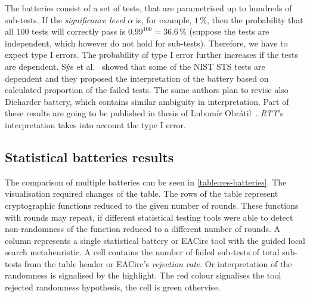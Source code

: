 \documentclass[
    digital,    %
    oneside,    %
    color,
    11pt,
    nocover,
    notable,
    nolof,
    nolot,
]{fithesis3}
\begin{document}
The batteries consist of a set of tests, that are parametrised up to hundreds of sub-tests. If the \textit{significance level} $\alpha$ is, for example, $1\,\%$, then the probability that all 100 tests will correctly pass is $0.99^{100}=36.6\,\%$ (suppose the tests are independent, which however do not hold for sub-tests). Therefore, we have to expect type I errors. The probability of type I error further increases if the tests are dependent. Sýs et al.~\cite{sys2015interpretation} showed that some of the NIST STS tests are dependent and they proposed the interpretation of the battery based on calculated proportion of the failed tests. The same authors plan to revise also Dieharder battery, which contains similar ambiguity in interpretation. Part of these results are going to be published in thesis of Lubomír Obrátil~\cite{obratilMgrThesis}. \textit{RTT}'s interpretation takes into account the type I error.

\subsection{Statistical batteries results}
\label{subsec:relatwork-stat-res}

The comparison of multiple batteries can be seen in \cref{table:res-batteries}. The visualisation required changes of the table. The rows of the table represent cryptographic functions reduced to the given number of rounds. These functions with rounds may repeat, if different statistical testing tools were able to detect non-randomness of the function reduced to a different number of rounds. A column represents a single statistical battery or EACirc tool with the guided local search metaheuristic. A cell contains the number of failed sub-tests of total sub-tests from the table header or EACirc's \textit{rejection rate}. Or interpretation of the randomness is signalised by the highlight. The red colour signalises the tool rejected randomness hypothesis, the cell is green othervise.
\end{document}
